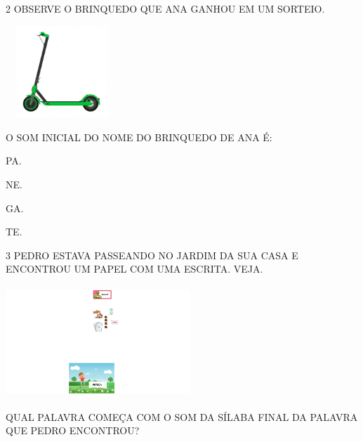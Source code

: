 \num{2} OBSERVE O BRINQUEDO QUE ANA GANHOU EM UM SORTEIO.

\includegraphics[width=1.65484in,height=1.36089in]{media/image83.png}

O SOM INICIAL DO NOME DO BRINQUEDO DE ANA É:

\begin{escolha}
\item PA.

\item NE.

\item GA.

\item TE.
\end{escolha}


\num{3} PEDRO ESTAVA PASSEANDO NO JARDIM DA SUA CASA E ENCONTROU UM PAPEL COM UMA ESCRITA. VEJA.

\includegraphics[width=2.73976in,height=1.64660in]{media/image84.png}


QUAL PALAVRA COMEÇA COM O SOM DA SÍLABA FINAL DA PALAVRA QUE PEDRO ENCONTROU?

